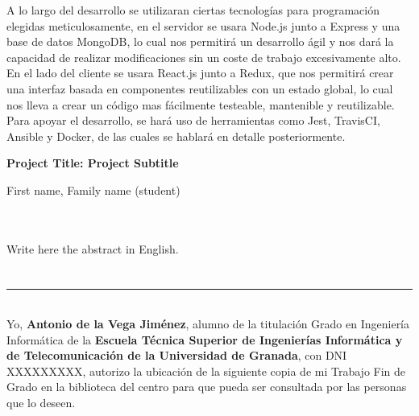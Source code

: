 A lo largo del desarrollo se utilizaran ciertas tecnologías para programación elegidas meticulosamente, en el servidor se usara Node.js junto a Express y una base de datos MongoDB, lo cual nos permitirá un desarrollo ágil y nos dará la capacidad de realizar modificaciones sin un coste de trabajo excesivamente alto. En el lado del cliente se usara React.js junto a Redux, que nos permitirá crear una interfaz basada en componentes reutilizables con un estado global, lo cual nos lleva a crear un código mas fácilmente testeable, mantenible y reutilizable. Para apoyar el desarrollo, se hará uso de herramientas como Jest, TravisCI, Ansible y Docker, de las cuales se hablará en detalle posteriormente.

\cleardoublepage


\thispagestyle{empty}


\begin{center}
{\large\bfseries Project Title: Project Subtitle}\\
\end{center}
\begin{center}
First name, Family name (student)\\
\end{center}

\\

\vspace{0.7cm}
\\

Write here the abstract in English.

\chapter*{}
\thispagestyle{empty}

\noindent\rule[-1ex]{\textwidth}{2pt}\\[4.5ex]

Yo, \textbf{Antonio de la Vega Jiménez}, alumno de la titulación Grado en Ingeniería Informática de la \textbf{Escuela Técnica Superior
de Ingenierías Informática y de Telecomunicación de la Universidad de Granada}, con DNI XXXXXXXXX, autorizo la
ubicación de la siguiente copia de mi Trabajo Fin de Grado en la biblioteca del centro para que pueda ser
consultada por las personas que lo deseen.

\vspace{6cm}

